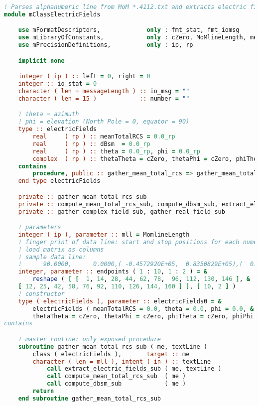 
{\tiny{
\begin{lstlisting}[language=Fortran]
! Parses alphanumeric line from MoM *.4112.txt and extracts electric field values
module mClassElectricFields

    use mFormatDescriptors,             only : fmt_stat, fmt_iomsg
    use mLibraryOfConstants,            only : cZero, MoMlineLength, messageLength
    use mPrecisionDefinitions,          only : ip, rp

    implicit none

    integer ( ip ) :: left = 0, right = 0
    integer :: io_stat = 0
    character ( len = messageLength ) :: io_msg = ""
    character ( len = 15 )            :: number = ""

    ! theta = azimuth	
    ! phi = elevation (North Pole = 0, equator = 90)
    type :: electricFields
        real     ( rp ) :: meanTotalRCS = 0.0_rp
        real     ( rp ) :: dBsm  = 0.0_rp
        real     ( rp ) :: theta = 0.0_rp, phi = 0.0_rp
        complex  ( rp ) :: thetaTheta = cZero, thetaPhi = cZero, phiTheta = cZero, phiPhi = cZero
    contains
        procedure, public :: gather_mean_total_rcs => gather_mean_total_rcs_sub
    end type electricFields

    private :: gather_mean_total_rcs_sub
    private :: compute_mean_total_rcs_sub, compute_dbsm_sub, extract_electric_fields_sub
    private :: gather_complex_field_sub, gather_real_field_sub

    ! parameters
    integer ( ip ), parameter :: mll = MomlineLength
    ! finger print of data line: start and stop positions for each numerical field
    ! load matrix as columns
    ! sample data line:
    !      90.0000,      0.0000,( -0.4572920E+05,  0.8350829E+05),(  0.2034567E+06, -0.9493007E+05),(  0.2034813E+06, -0.9492184E+05),( -0.1727375E+06,  0.3787291E+05)
    integer, parameter :: endpoints ( 1 : 10, 1 : 2 ) = &
    	reshape ( [ [  1, 14, 28, 44, 62, 78,  96, 112, 130, 146 ], &
	[ 12, 25, 42, 58, 76, 92, 110, 126, 144, 160 ] ], [ 10, 2 ] )
    ! constructor
    type ( electricFields ), parameter :: electricFields0 = &
		electricFields ( meanTotalRCS = 0.0, theta = 0.0, phi = 0.0, &
		thetaTheta = cZero, thetaPhi = cZero, phiTheta = cZero, phiPhi = cZero )
contains

    ! master routine: only exposed procedure
    subroutine gather_mean_total_rcs_sub ( me, textLine )
        class ( electricFields ),       target :: me
        character ( len = mll ), intent ( in ) :: textLine
            call extract_electric_fields_sub ( me, textLine )
            call compute_mean_total_rcs_sub  ( me )
            call compute_dbsm_sub            ( me )
        return
    end subroutine gather_mean_total_rcs_sub


\end{lstlisting}}}
